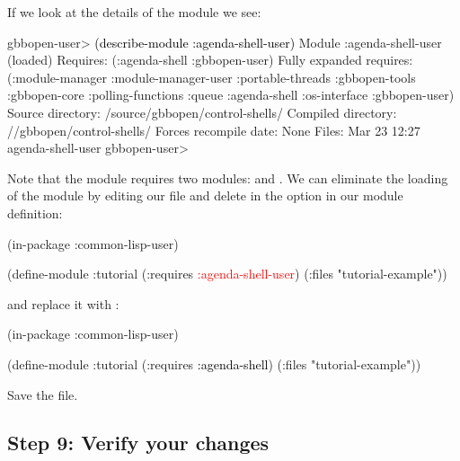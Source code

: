 \documentclass[10pt,twoside,english,pdftex]{article}
\begin{document}
If we look at the details of the  module we
see:
%
\W\supp
\begin{example}
\textcolor{darkergray}{%
  gbbopen-user> \textcolor{black}{(describe-module :agenda-shell-user)}
  Module :agenda-shell-user (loaded)
    Requires: (:agenda-shell :gbbopen-user)
    Fully expanded requires: (:module-manager :module-manager-user :portable-threads
                              :gbbopen-tools :gbbopen-core :polling-functions
                              :queue :agenda-shell :os-interface :gbbopen-user)
    Source directory: /source/gbbopen/control-shells/
    Compiled directory: //gbbopen/control-shells/
    Forces recompile date: None
    Files:   Mar 23 12:27  agenda-shell-user 
  gbbopen-user>}
\end{example}
%
Note that the  module requires two modules:
 and . We can eliminate
the loading of the  module by editing our
 file and delete  in
the  option in our  module definition:
%
\W\supp\notpretop
\begin{example}
\textcolor{darkergray}{%
  (in-package :common-lisp-user)

  (define-module :tutorial
    (:requires \textcolor{red}{:agenda-shell-user})
    (:files "tutorial-example"))}
\end{example}
%
and replace it with :
%
\W\supp\notpretop
\begin{example}
\textcolor{darkergray}{%
  (in-package :common-lisp-user)

  (define-module :tutorial
    (:requires \textcolor{black}{:agenda-shell})
    (:files "tutorial-example"))}
\end{example}
%
Save the file.

\subsection*{Step 9: Verify your changes}
\end{document}
